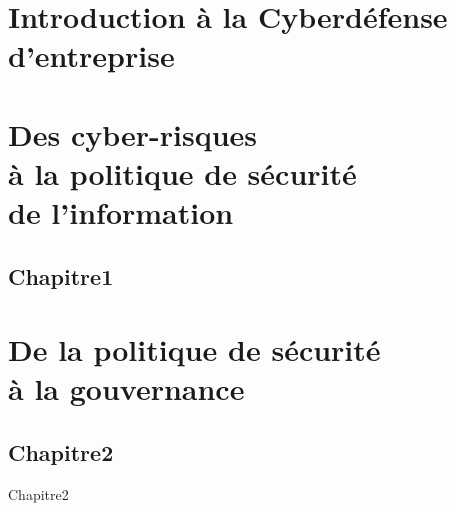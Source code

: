 


\part[Cyber généralités]{Introduction à la Cyberdéfense d'entreprise}




\part[CyberRisques]{Des cyber-risques \\à la politique de sécurité \\de l'information}

\chapter{Chapitre1}





\part[Mesures de sécurité]{De la politique de sécurité \\à la gouvernance}

\chapter{Chapitre2}
Chapitre2




